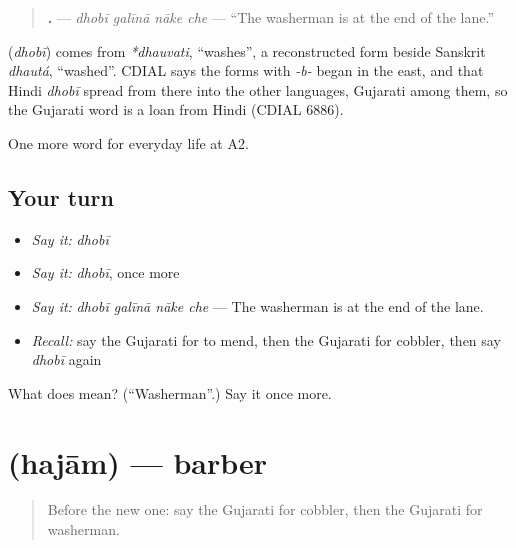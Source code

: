 \begin{quote}
\textbf{   .} — \emph{dhobī galīnā nāke che} — \textquotedblleft{}The washerman is at the end of the lane.\textquotedblright{}
\end{quote}

\begin{cousinweb}
\textbf{} (\emph{dhobī}) comes from \emph{*dhauvati}, \textquotedblleft{}washes\textquotedblright{}, a reconstructed form beside Sanskrit \emph{dhautá}, \textquotedblleft{}washed\textquotedblright{}. CDIAL says the forms with \emph{-b-} began in the east, and that Hindi \emph{dhobī} spread from there into the other languages, Gujarati among them, so the Gujarati word is a loan from Hindi (CDIAL 6886).
\end{cousinweb}

\begin{grammarlens}[title={What you've built}]
One more word for everyday life at A2.
\end{grammarlens}

\subsection*{Your turn}
\begin{itemize}
\raggedright
  \item \emph{Say it:} \emph{dhobī}
  \item \emph{Say it:} \emph{dhobī}, once more
  \item \emph{Say it:} \emph{dhobī galīnā nāke che} — The washerman is at the end of the lane.
  \item \emph{Recall:} say the Gujarati for to mend, then the Gujarati for cobbler, then say \emph{dhobī} again
\end{itemize}

\begin{tcolorbox}[breakable,colback=teal!4,colframe=teal!35!black,title={Before you move on}]
What does  mean? (\textquotedblleft{}Washerman\textquotedblright{}.) Say it once more.
\end{tcolorbox}
\section[\texorpdfstring{\gu{હજામ} (hajām)}{હજામ (hajām)}]{ (hajām) — barber}

\label{lesson:GU-C201-hajam}



\begin{quote}
Before the new one: say the Gujarati for cobbler, then the Gujarati for washerman.
\end{quote}

